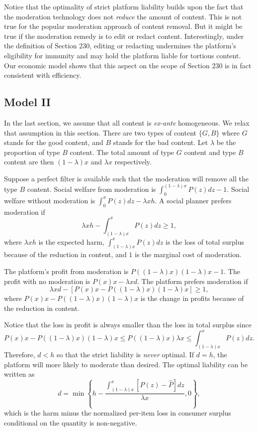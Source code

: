 \documentclass[openbib,12pt]{article}  %
\newcommand{\gs}{\geqslant}
\newcommand{\ls}{\leqslant}
\begin{document}
Notice that the optimality of strict platform liability builds upon the fact that the moderation technology does not \emph{reduce} the amount of content. This is not true for the popular moderation approach of content removal. But it might be true if the moderation remedy is to edit or redact content. Interestingly, under the definition of Section 230, editing or redacting undermines the platform's eligibility for immunity and may hold the platform liable for tortious content. Our economic model shows that this aspect on the scope of Section 230 is in fact consistent with efficiency.

\subsection{Model II}
In the last section, we assume that all content is \emph{ex-ante} homogeneous. We relax that assumption in this section.
There are two types of content $\{G, B\}$ where $G$ stands for the good content, and $B$ stands for the bad content. Let $\lambda$ be the proportion of type $B$ content. The total amount of type $G$ content and type $B$ content are then $(1-\lambda)x$ and $\lambda x$ respectively. 

Suppose a perfect filter is available such that the moderation will remove all the type $B$ content. Social welfare from moderation is $\int_0^{(1-\lambda)x} P(z)dz-1$. Social welfare without moderation is $\int_0^x P(z)dz-\lambda xh$. A social planner prefers moderation if 
\begin{equation}\label{eqn:efficiency_2}
    \lambda xh - \int_{(1-\lambda)x}^x P(z)dz \gs 1,
\end{equation}
where $\lambda xh$ is the expected harm, $\int_{(1-\lambda)x}^x P(z)dz$ is the loss of total surplus because of the reduction in content, and $1$ is the marginal cost of moderation.

The platform's profit from moderation is $P((1-\lambda)x)(1-\lambda)x-1$. The profit with no moderation is $P(x)x-\lambda xd$. The platform prefers moderation if 
\begin{equation}\label{eqn:platform_2}
    \lambda xd - [P(x)x-P((1-\lambda)x)(1-\lambda)x] \gs 1,
\end{equation}
where $P(x)x-P((1-\lambda)x)(1-\lambda)x$ is the change in profits because of the reduction in content. 

Notice that the loss in profit is always smaller than the loss in total surplus since 
\begin{equation*}
    P(x)x-P((1-\lambda)x)(1-\lambda)x \ls P((1-\lambda)x)\lambda x \ls \int_{(1-\lambda)x}^x P(z)dz.
\end{equation*}
Therefore, $d<h$ so that the strict liability is \emph{never} optimal. If $d=h$, the platform will more likely to moderate than desired. 
The optimal liability can be written as 
\begin{equation}\label{eqn:liability_1}
    d=\min \left\{h-\frac{\int_{(1-\lambda)x}^x [P(z)-\hat{P}]dz}{\lambda x}, 0\right\},
\end{equation}
which is the harm minus the normalized per-item loss in consumer surplus conditional on the quantity is non-negative. 
\end{document}

